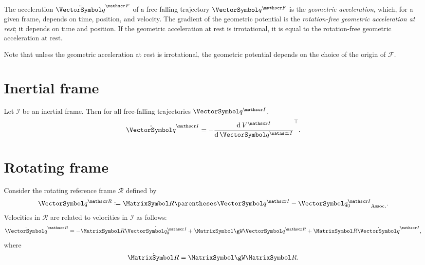 \documentclass[10pt, a4paper, twoside]{basestyle}
\begin{document}
The acceleration $\SecondTimeDerivative\vq^{\mathscr F}$ of a free-falling trajectory $\vq^{\mathscr F}$
is the \emph{geometric acceleration}, which, for a given frame, depends on time, position, and velocity.
The gradient of the geometric potential is the \emph{rotation-free geometric acceleration at rest}; it
depends on time and position. If the geometric acceleration at rest is irrotational, it is equal to the
rotation-free geometric acceleration at rest.

Note that unless the geometric acceleration at rest is irrotational, the geometric potential depends on
the choice of the origin of $\mathscr F$.

\section{Inertial frame}
Let $\mathscr I$ be an inertial frame. Then for all free-falling trajectories $\vq^{\mathscr I}$,
\begin{equation}
\SecondTimeDerivative\vq^{\mathscr I}=-\Transpose{\deriv{\vq^{\mathscr I}}{V^{\mathscr I}}}\text.
\end{equation}
\section{Rotating frame}
Consider the rotating reference frame $\mathscr R$ defined by
\begin{equation}
\vq^{\mathscr R} \DefineAs \matR \pa{\vq^{\mathscr I} - \vq_0^{\mathscr I}}\text.
\end{equation}
Velocities in $\mathscr R$ are related to velocities in $\mathscr I$ as follows:
\begin{equation}
\TimeDerivative\vq^{\mathscr R} =  -  \matR \TimeDerivative{\vq_0^{\mathscr I}} + \MatrixSymbol\gW \vq^{\mathscr R} + \matR \TimeDerivative\vq^{\mathscr I}\text,
\end{equation}
where
\[
\TimeDerivative{\matR}=\MatrixSymbol\gW \matR\text.
\]
\end{document}
